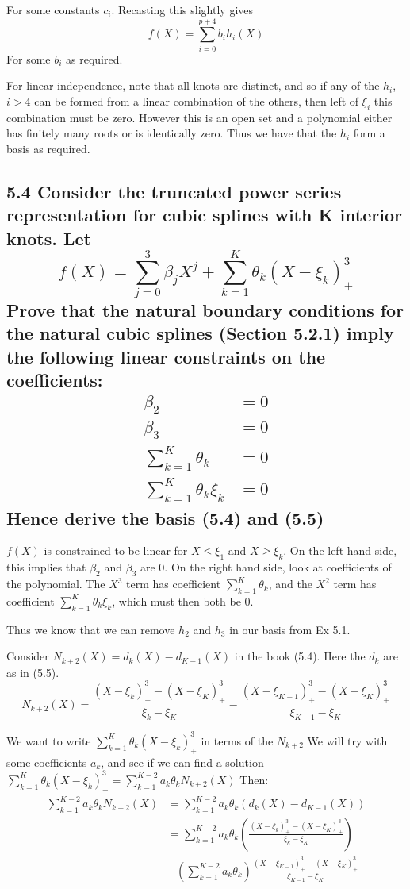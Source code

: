 For some constants $c_i$. Recasting this slightly gives
$$f(X) = \sum_{i=0}^{p+4} b_i h_i(X)$$ 
For some $b_i$ as required.

For linear independence, note that all knots are distinct, and so if any of the $h_i$, $i>4$ can be formed from a linear combination of the others, then left of $\xi_i$ this combination must be zero. However this is an open set and a polynomial either has finitely many roots or is identically zero. Thus we have that the $h_i$ form a basis as required. 


\subsection*{5.4 Consider the truncated power series representation for cubic splines with K interior knots. Let
$$f(X) = \sum_{j=0}^3 \beta_j X^j + \sum_{k=1}^K \theta_k (X - \xi_k)^3_+$$
Prove that the natural boundary conditions for the natural cubic splines (Section 5.2.1) imply the following linear constraints on the coefficients:
\begin{align*}
    \beta_2 &= 0 \\
    \beta_3 &= 0 \\
    \sum_{k=1}^K \theta_k &= 0 \\
    \sum_{k=1}^K \theta_k \xi_k  &= 0
\end{align*}
Hence derive the basis (5.4) and (5.5)
}

$f(X)$ is constrained to be linear for $X \leq \xi_1$ and $X \geq \xi_k$.
On the left hand side, this implies that $\beta_2$ and $\beta_3$ are $0$.
On the right hand side, look at coefficients of the polynomial.
The $X^3$ term has coefficient $\sum_{k=1}^K \theta_k$, and the $X^2$ term has coefficient $\sum_{k=1}^K \theta_k \xi_k $, which must then both be $0$.

Thus we know that we can remove $h_2$ and $h_3$ in our basis from Ex 5.1.

Consider $N_{k+2}(X) = d_k(X) - d_{K-1}(X)$ in the book (5.4). Here the $d_k$ are as in (5.5).
$$N_{k+2}(X) = \frac{(X - \xi_k)^3_+ - (X - \xi_K)^3_+}{\xi_k - \xi_K} - \frac{(X - \xi_{K-1})^3_+ - (X - \xi_K)^3_+}{\xi_{K-1} - \xi_K}$$

We want to write $\sum_{k=1}^K \theta_k (X - \xi_k)^3_+$ in terms of the $N_{k+2}$
We will try with some coefficients $a_k$, and see if we can find a solution $\sum_{k=1}^K \theta_k (X - \xi_k)^3_+ = \sum_{k=1}^{K-2} a_k \theta_k N_{k+2}(X)$
Then:
\begin{align*}
    \sum_{k=1}^{K-2}a_k \theta_k N_{k+2}(X) &= \sum_{k=1}^{K-2 }a_k \theta_k \left( d_k(X) - d_{K-1}(X) \right) \\
    &= \sum_{k=1}^{K-2 }a_k \theta_k \left( \frac{(X - \xi_k)^3_+ - (X - \xi_K)^3_+}{\xi_k - \xi_K} \right) \\ &- \left(\sum_{k=1}^{K-2 }a_k \theta_k \right) \frac{(X - \xi_{K-1})^3_+ - (X  - \xi_K)^3_+}{\xi_{K-1} - \xi_K}
\end{align*}

